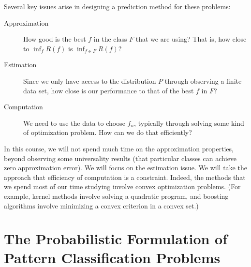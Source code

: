 \documentclass[twoside]{article}
\theoremstyle{definition}
\theoremstyle{definition}
\theoremstyle{remark}
\begin{document}
Several key issues arise in designing a prediction method for these
problems:

 \begin{description}
   \item[Approximation] How good is the best $f$ in the class $F$ that
   we are using? That is, how close to $\inf_f R(f)$ is $\inf_{f\in F}
   R(f)$?
   \item[Estimation] Since we only have access to the distribution $P$
   through observing a finite data set, how close is our performance
   to that of the best $f$ in $F$?
   \item[Computation] We need to use the data to choose $f_n$,
   typically through solving some kind of optimization problem. How
   can we do that efficiently?
 \end{description}

In this course, we will not spend much time on the approximation
properties, beyond observing some universality results (that
particular classes can achieve zero approximation error). We will
focus on the estimation issue. We will take the approach that
efficiency of computation is a constraint. Indeed, the methods
that we spend most of our time studying involve convex optimization
problems. (For example, kernel methods involve solving a quadratic
program, and boosting algorithms involve minimizing a convex criterion in
a convex set.)

\section{The Probabilistic Formulation of Pattern Classification
Problems}
\end{document}
